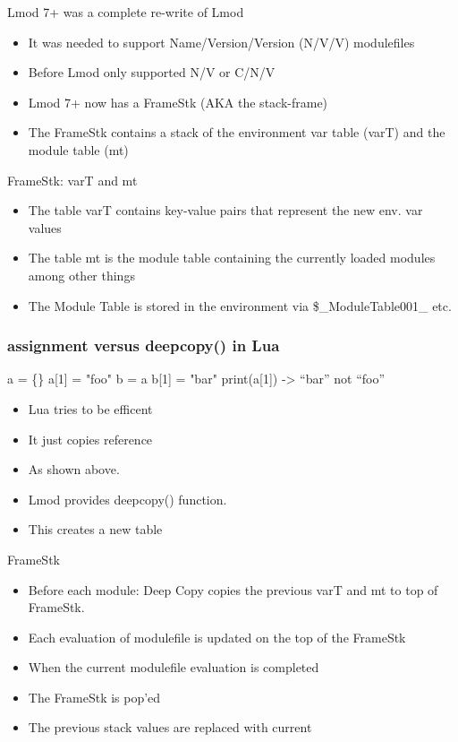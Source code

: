 \documentclass{beamer}
\begin{document}
\begin{frame}{Lmod 7+ was a complete re-write of Lmod}
  \begin{itemize}
    \item It was needed to support Name/Version/Version (N/V/V) modulefiles
    \item Before Lmod only supported N/V or C/N/V
    \item Lmod 7+ now has a FrameStk (AKA the stack-frame)
    \item The FrameStk contains a stack of the environment var table (varT) and the
      module table (mt)
  \end{itemize}
\end{frame}

\begin{frame}{FrameStk: varT and mt}
  \begin{itemize}
    \item The table varT contains key-value pairs that represent the
      new env. var values
    \item The table mt is the module table containing the currently
      loaded modules among other things
    \item The Module Table is stored in the environment via
      \$\_ModuleTable001\_ etc.
  \end{itemize}
\end{frame}

\begin{frame}[fragile]
    \frametitle{assignment versus deepcopy() in Lua}
 {\small
    \begin{semiverbatim}
  a = \{\}
  a[1] = "foo"
  b    = a
  b[1] = "bar"
  print(a[1])  -> ``bar'' not ``foo''
    \end{semiverbatim}
}
  \begin{itemize}
    \item Lua tries to be efficent
    \item It just copies reference
    \item As shown above.
    \item Lmod provides deepcopy() function.
    \item This creates a new table
  \end{itemize}
\end{frame}

\begin{frame}{FrameStk}
  \begin{itemize}
    \item Before each module: Deep Copy copies the previous varT and mt to top of
      FrameStk.
    \item Each evaluation of modulefile is updated on the top of the
      FrameStk
    \item When the current modulefile evaluation is completed
    \item The FrameStk is pop'ed
    \item The previous stack values are replaced with current
  \end{itemize}
\end{frame}
\end{document}
